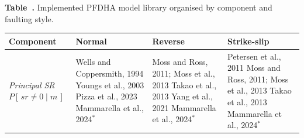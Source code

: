 \begin{table}[!htbp]
  \centering
  \scriptsize
  \renewcommand{\arraystretch}{1.14}
  \setlength{\tabcolsep}{3pt}

  \label{tab:model_library}
  \begin{minipage}{\linewidth}
  \raggedright
  {\bfseries Table~\thetable.} Implemented PFDHA model library organised by component and faulting style.\par\vspace{0.6em}
  \end{minipage}

  \begin{tabularx}{\linewidth}{@{}>{\raggedright\arraybackslash}p{2.0cm} >{\raggedright\arraybackslash}X >{\raggedright\arraybackslash}X >{\raggedright\arraybackslash}X@{}}
    \toprule
    \textbf{Component} & \textbf{Normal} & \textbf{Reverse} & \textbf{Strike-slip} \\
    \midrule

    \textit{Principal SR}\newline
    {\scriptsize $P[\,sr \neq 0 \mid m\,]$} &
      Wells and Coppersmith, 1994\newline
      Youngs et al., 2003\newline
      Pizza et al., 2023\newline
      Mammarella et al., 2024$^{*}$ &
      Moss and Ross, 2011; Moss et al., 2013\newline
      Takao et al., 2013\newline
      Yang et al., 2021\newline
      Mammarella et al., 2024$^{*}$ &
      Petersen et al., 2011\newline
      Moss and Ross, 2011; Moss et al., 2013\newline
      Takao et al., 2013\newline
      Mammarella et al., 2024$^{*}$ \\

    \midrule


\end{tabularx}
\end{table}
